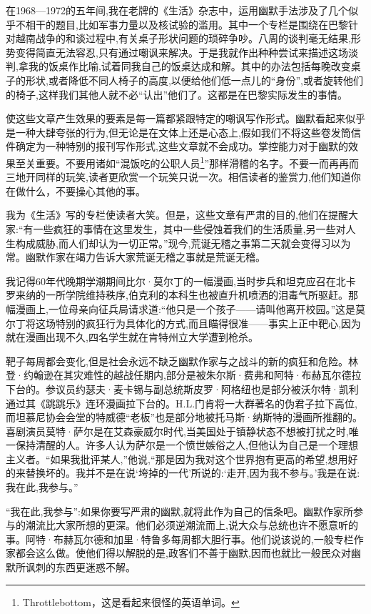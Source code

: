 在1968—1972的五年间,我在老牌的《生活》杂志中，运用幽默手法涉及了几个似乎不相干的题目,比如军事力量以及核试验的滥用。其中一个专栏是围绕在巴黎针对越南战争的和谈过程中,有关桌子形状问题的琐碎争吵。八周的谈判毫无结果,形势变得简直无法容忍,只有通过嘲讽来解决。于是我就作出种种尝试来描述这场淡判,拿我的饭桌作比喻,试着同我自己的饭桌达成和解。其中的办法包括每晚改变桌子的形状,或者降低不同人椅子的高度,以便给他们低一点儿的“身份”,或者旋转他们的椅子,这样我们其他人就不必“认出”他们了。这都是在巴黎实际发生的事情。

使这些文章产生效果的要素是每一篇都紧跟特定的嘲讽写作形式。幽默看起来似乎是一种大肆夸张的行为,但无论是在文体上还是心态上,假如我们不将这些卷发筒信件确定为一种特别的报刊写作形式,这些文章就不会成功。掌控能力对于幽默的效果至关重要。不要用诸如“混饭吃的公职人员\footnote{Throttlebottom，这是看起来很怪的英语单词。}”那样滑稽的名字。不要一而再再而三地开同样的玩笑,读者更欣赏一个玩笑只说一次。相信读者的鉴赏力,他们知道你在做什么，不要操心其他的事。


我为《生活》写的专栏使读者大笑。但是，这些文章有严肃的目的,他们在提醒大家:“有一些疯狂的事情在这里发生，其中一些侵蚀着我们的生活质量,另一些对人生构成威胁,而人们却认为一切正常。”现今,荒诞无稽之事第二天就会变得习以为常。幽默作家在竭力告诉大家荒诞无稽之事就是荒诞无稽。

我记得60年代晚期学潮期间比尔·莫尔丁的一幅漫画,当时步兵和坦克应召在北卡罗来纳的一所学院维持秩序,伯克利的本科生也被直升机喷洒的泪毒气所驱赶。那幅漫画上,一位母亲向征兵局请求道:“他只是一个孩子——请叫他离开校园。”这是莫尔丁将这场特别的疯狂行为具体化的方式,而且瞄得很准——事实上正中靶心,因为就在漫画出现不久,四名学生就在肯特州立大学遭到枪杀。

靶子每周都会变化,但是社会永远不缺乏幽默作家与之战斗的新的疯狂和危险。林登·约翰逊在其灾难性的越战任期内,部分是被朱尔斯·费弗和阿特·布赫瓦尔德拉下台的。参议员约瑟夫·麦卡锡与副总统斯皮罗·阿格纽也是部分被沃尔特·凯利通过其《跳跳乐》连环漫画拉下台的。H.L.门肯将一大群著名的伪君子拉下高位,而坦慕尼协会会堂的特威德“老板”也是部分地被托马斯·纳斯特的漫画所推翻的。喜剧演员莫特·萨尔是在艾森豪威尔时代,当美国处于镇静状态不想被打扰之时,唯一保持清醒的人。许多人认为萨尔是一个愤世嫉俗之人,但他认为自己是一个理想主义者。“如果我批评某人,”他说,“那是因为我对这个世界抱有更高的希望,想用好的来替换坏的。我并不是在说‘垮掉的一代’所说的:‘走开,因为我不参与。’我是在说:我在此,我参与。”

“我在此,我参与”:如果你要写严肃的幽默,就将此作为自己的信条吧。幽默作家所参与的潮流比大家所想的更深。他们必须逆潮流而上,说大众与总统也许不愿意听的事。阿特·布赫瓦尔德和加里·特鲁多每周都大胆行事。他们说该说的,一般专栏作家都会这么做。使他们得以解脱的是,政客们不善于幽默,因而也就比一般民众对幽默所讽刺的东西更迷惑不解。

